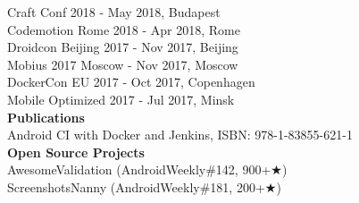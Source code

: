 \documentclass[12pt, a4paper]{article}
\begin{document}
Craft Conf 2018 - May 2018, Budapest \\

Codemotion Rome 2018 - Apr 2018, Rome \\

Droidcon Beijing 2017 - Nov 2017, Beijing \\

Mobius 2017 Moscow - Nov 2017, Moscow \\

DockerCon EU 2017 - Oct 2017, Copenhagen \\

Mobile Optimized 2017 - Jul 2017, Minsk \\

\textcolor{highlightblue}{\textbf{\huge Publications}} \\

Android CI with Docker and Jenkins, ISBN: 978-1-83855-621-1 \\

\textcolor{highlightblue}{\textbf{\huge Open Source Projects}} \\

AwesomeValidation (AndroidWeekly\#142, 900+{\DejaVuSans ★}) \\

ScreenshotsNanny (AndroidWeekly\#181, 200+{\DejaVuSans ★}) \\
\end{document}

